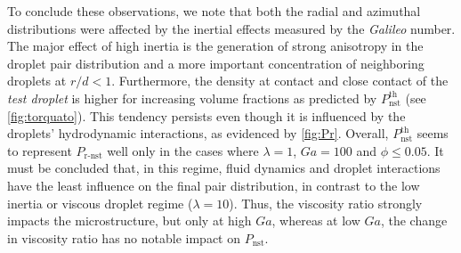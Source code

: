 To conclude these observations, we note that both the radial and azimuthal distributions were affected by the inertial effects measured by the \textit{Galileo} number. 
The major effect of high inertia is the generation of strong anisotropy in the droplet pair distribution and a more important concentration of neighboring droplets at $r/d < 1$. 
Furthermore, the density at contact and close contact of the \textit{test droplet} is higher for increasing volume fractions as predicted by $P_\text{nst}^\text{th}$  (see \ref{fig:torquato}).
This tendency persists even though it is influenced by the droplets' hydrodynamic interactions, as evidenced by \ref{fig:Pr}. 
Overall, $P_\text{nst}^\text{th}$ seems to represent $P_\text{r-nst}$ well only in the cases where $\lambda =1$, $Ga = 100$ and $\phi \le 0.05$. 
It must be concluded that, in this regime, fluid dynamics and droplet interactions have the least influence on the final pair distribution, in contrast to the low inertia or viscous droplet regime ($\lambda =10$).
Thus, the viscosity ratio strongly impacts the microstructure, but only at high $Ga$, whereas at low $Ga$, the change in viscosity ratio has no notable impact on $P_\text{nst}$. 

